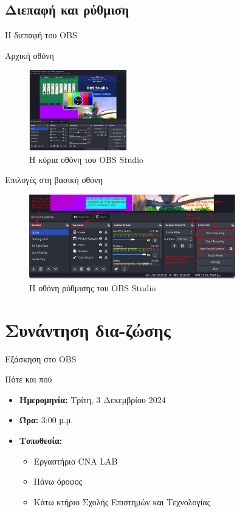 \documentclass[aspectratio=169]{beamer}
\begin{document}
\subsection{Διεπαφή και ρύθμιση}
\begin{frame}[allowframebreaks]{Η διεπαφή του OBS}
  \begin{block}{Αρχική οθόνη}
    \begin{figure}
      \includegraphics[width=0.38\textwidth]{images/screenshot_obs.png}
      \caption{Η κύρια οθόνη του OBS Studio}
      \label{fig:obs_interface}
    \end{figure}
  \end{block}
  \begin{block}{Επιλογές στη βασική οθόνη}
    \begin{figure}
      \includegraphics[width=0.8\textwidth]{images/obs_tools.png}
      \caption{Η οθόνη ρύθμισης του OBS Studio}
      \label{fig:obs_interface2}
    \end{figure}
  \end{block}
\end{frame}
\section{Συνάντηση δια-ζώσης}
\begin{frame}[allowframebreaks]{Εξάσκηση στο OBS}
  \begin{alertblock}{Πότε και πού}
    \begin{itemize}
      \item \textbf{Ημερομηνία:} Τρίτη, 3 Δεκεμβρίου 2024
      \item \textbf{Ώρα:} 3:00 μ.μ.
      \item \textbf{Τοποθεσία:}
        \begin{itemize}
          \item Εργαστήριο CNA LAB
          \item Πάνω όροφος
          \item Κάτω κτήριο Σχολής Επιστημών και Τεχνολογίας
        \end{itemize}
    \end{itemize}
  \end{alertblock}
\end{frame}
\end{document}
